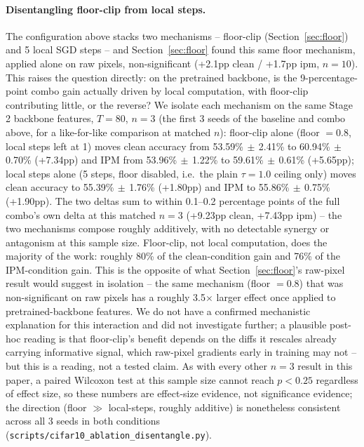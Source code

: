 \documentclass{article}
\begin{document}
\paragraph{Disentangling floor-clip from local steps.} The configuration above
stacks two mechanisms -- floor-clip (Section~\ref{sec:floor}) and 5 local SGD
steps -- and Section~\ref{sec:floor} found this same floor mechanism, applied
alone on raw pixels, non-significant (+2.1pp clean / +1.7pp ipm, $n{=}10$).
This raises the question directly: on the pretrained backbone, is the
9-percentage-point combo gain actually driven by local computation, with
floor-clip contributing little, or the reverse? We isolate each mechanism on
the same Stage 2 backbone features, $T{=}80$, $n{=}3$ (the first 3 seeds of the
baseline and combo above, for a like-for-like comparison at matched $n$):
floor-clip alone (floor $=0.8$, local steps left at 1) moves clean accuracy
from 53.59\%$\,\pm\,$2.41\% to 60.94\%$\,\pm\,$0.70\% (+7.34pp) and IPM from
53.96\%$\,\pm\,$1.22\% to 59.61\%$\,\pm\,$0.61\% (+5.65pp); local steps alone (5
steps, floor disabled, i.e.\ the plain $\tau{=}1.0$ ceiling only) moves clean
accuracy to 55.39\%$\,\pm\,$1.76\% (+1.80pp) and IPM to 55.86\%$\,\pm\,$0.75\%
(+1.90pp). The two deltas sum to within 0.1--0.2 percentage points of the full
combo's own delta at this matched $n{=}3$ (+9.23pp clean, +7.43pp ipm) -- the
two mechanisms compose roughly additively, with no detectable synergy or
antagonism at this sample size. Floor-clip, not local computation, does the
majority of the work: roughly 80\% of the clean-condition gain and 76\% of the
IPM-condition gain. This is the opposite of what Section~\ref{sec:floor}'s
raw-pixel result would suggest in isolation -- the same mechanism (floor
$=0.8$) that was non-significant on raw pixels has a roughly 3.5$\times$
larger effect once applied to pretrained-backbone features. We do not have a
confirmed mechanistic explanation for this interaction and did not investigate
further; a plausible post-hoc reading is that floor-clip's benefit depends on
the diffs it rescales already carrying informative signal, which raw-pixel
gradients early in training may not -- but this is a reading, not a tested
claim. As with every other $n{=}3$ result in this paper, a paired Wilcoxon test
at this sample size cannot reach $p<0.25$ regardless of effect size, so these
numbers are effect-size evidence, not significance evidence; the direction
(floor $\gg$ local-steps, roughly additive) is nonetheless consistent across
all 3 seeds in both conditions (\texttt{scripts/cifar10\_ablation\_disentangle.py}).
\end{document}
